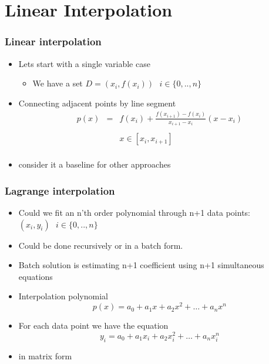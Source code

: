 \documentclass[10pt]{beamer}
\begin{document}
\section{Linear Interpolation}


\begin{frame}
  \frametitle{Linear interpolation}
  \begin{itemize}
  \item Lets start with a single variable case
    \begin{itemize}
    \item We have a set $D = (x_i, f(x_i)) \mbox {   } i\in \{ 0, .., n \}$
    \end{itemize}
  \item Connecting adjacent points by line segment
    \[
      \begin{array}{lll}
        p(x) & = &  f(x_i) + \frac{f(x_{i+1}) - f(x_i)}{x_{i+1} - x_i} (x - x_i)\\ & & \\
             &   &  x\in [x_i, x_{i+1}]\\
      \end{array}
    \]
  \item consider it a baseline for other approaches
  \end{itemize}
\end{frame}

\begin{frame}
  \frametitle{Lagrange interpolation}
  \begin{itemize}
  \item Could we fit an n'th order polynomial through n+1 data points:  $(x_i, y_i) \mbox {   } i\in \{ 0, .., n \}$
  \item Could be done recursively or in a batch form.
  \item Batch solution is estimating n+1 coefficient using n+1 simultaneous equations
    \pause
  \item Interpolation polynomial
    \[
      p(x) = a_0 + a_1 x + a_2 x^2 + \ldots + a_n x^n
    \]
  \item For each data point we have the equation
    \[
      y_i = a_0 + a_1 x_i + a_2 x_i^2 + \ldots + a_n x_i^n
    \]
  \item in matrix form
  \end{itemize}
\end{frame}
\end{document}

